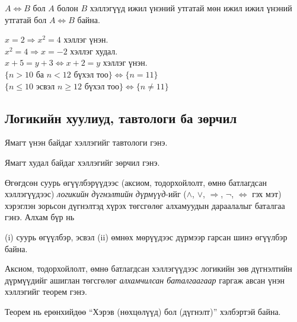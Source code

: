 $A\Leftrightarrow B$ бол $A$ болон $B$ хэллэгүүд ижил үнэний утгатай мөн ижил ижил үнэний утгатай бол $A\Leftrightarrow B$ байна. 
\begin{example}
$x=2\Rightarrow x^2=4$ хэллэг үнэн.\\
$x^2=4\Rightarrow x=-2$ хэллэг худал.\\
$x+5=y+3\Leftrightarrow x+2=y$ хэллэг үнэн. \\
$\{n>10$ ба $n<12 {\text{ бүхэл тоо}}\}\Leftrightarrow \{n=11\}$\\
$\{n\leq 10$ эсвэл $n\geq 12 {\text{ бүхэл тоо}}\}\Leftrightarrow \{n\neq 11\}$\\
\end{example}
\subsection{Логикийн хуулиуд, тавтологи ба зөрчил}
\begin{definition}[Тавтологи] Ямагт үнэн байдаг хэллэгийг тавтологи гэнэ.
\end{definition}
\begin{definition}[Зөрчил]
    Ямагт худал байдаг хэллэгийг зөрчил гэнэ.
\end{definition}
\begin{definition}[Баталгаа]
Өгөгдсөн суурь өгүүлбэрүүдээс (аксиом, тодорхойлолт, өмнө батлагдсан хэллэгүүдээс) \emph{логикийн дүгнэлтийн дүрмүүд}-ийг ($\land$, $\lor$, $\Rightarrow$, $\lnot$, $\Leftrightarrow$ гэх мэт) хэрэглэн зорьсон дүгнэлтэд хүрэх төгсгөлөг алхамуудын дараалалыг баталгаа гэнэ. Алхам бүр нь 

(i) суурь өгүүлбэр, эсвэл 
(ii) өмнөх мөрүүдээс дүрмээр гарсан шинэ өгүүлбэр байна.
\end{definition}
\begin{definition}[Tеорем]
Аксиом, тодорхойлолт, өмнө батлагдсан хэллэгүүдээс логикийн зөв дүгнэлтийн дүрмүүдийг ашиглан төгсгөлөг \emph{алхамчилсан баталгаагаар} гаргаж авсан үнэн хэллэгийг теорем гэнэ.
\end{definition}
 Теорем нь ерөнхийдөө “Хэрэв (нөхцөлүүд) бол (дүгнэлт)” хэлбэртэй байна.

